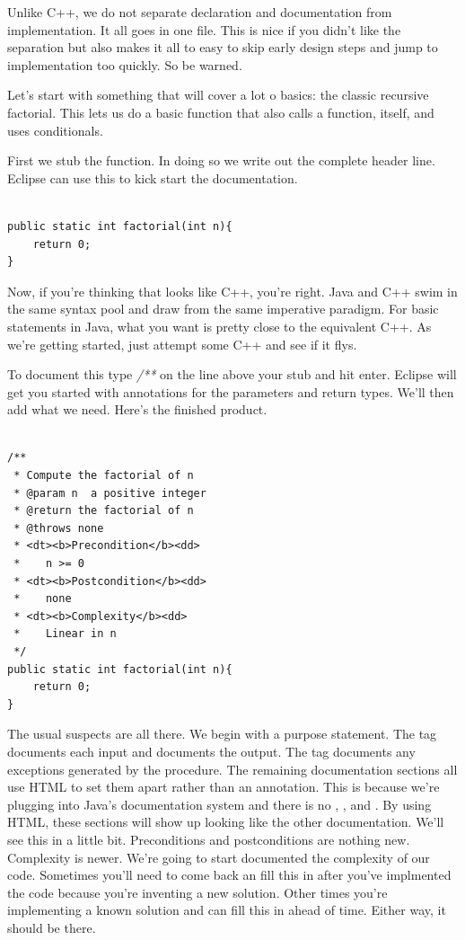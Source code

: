 \documentclass[]{tufte-handout}
\begin{document}
Unlike C++, we do not separate declaration and documentation from implementation. It all goes in one file. This is nice if you didn't like the separation but also makes it all to easy to skip early design steps and jump to implementation too quickly. So be warned. 


Let's start with something that will cover a lot o basics: the classic recursive factorial. This lets us do a basic function that also calls a function, itself, and uses conditionals. 

First we stub the function. In doing so we write out the complete header line. Eclipse can use this to kick start the documentation.

\begin{lstlisting}

public static int factorial(int n){
	return 0;
}

\end{lstlisting}

Now, if you're thinking that looks like C++, you're right. Java and C++ swim in the same syntax pool and draw from the same imperative paradigm. For basic statements in Java, what you want is pretty close to the equivalent C++. As we're getting started, just attempt some C++ and see if it flys. 

To document this type \textit{/**} on the line above your stub and hit enter. Eclipse will get you started with annotations for the parameters and return types. We'll then add what we need. Here's the finished product. 

\begin{lstlisting}

/**
 * Compute the factorial of n
 * @param n	 a positive integer
 * @return the factorial of n
 * @throws none
 * <dt><b>Precondition</b><dd>
 *    n >= 0
 * <dt><b>Postcondition</b><dd>
 *    none
 * <dt><b>Complexity</b><dd> 	 
 *    Linear in n
 */
public static int factorial(int n){
	return 0;
}

\end{lstlisting}

The usual suspects are all there. We begin with a purpose statement. The \@param tag documents each input and \@return documents the output.  The \@throws tag documents any exceptions generated by the procedure. The remaining documentation sections all use HTML to set them apart rather than an \@ annotation. This is because we're plugging into Java's documentation system and there is no \@pre, \@post, and \@complexity.  By using HTML, these sections will show up looking like the other documentation. We'll see this in a little bit. Preconditions and postconditions are nothing new. Complexity is newer. We're going to start documented the complexity of our code. Sometimes you'll need to come back an fill this in after you've implmented the code because you're inventing a new solution. Other times you're implementing a known solution and can fill this in ahead of time. Either way, it should be there. 
\end{document}
